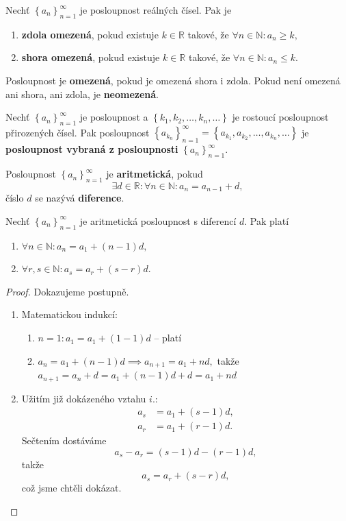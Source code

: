 \begin{definition}
    Nechť $\left \{ a_n \right \}_{n=1}^\infty $ je posloupnost reálných čísel. Pak je
    \begin{enumerate}[$i.$]
    \item \textbf{zdola omezená}, pokud existuje $k\in \mathbb R$ takové, že
    $\forall n \in \mathbb N\colon a_n \geq k,$
   	\item \textbf{shora omezená}, pokud existuje $k\in \mathbb R$ takové, že
    $\forall n \in \mathbb N\colon a_n \leq k.$
    \end{enumerate}
    Posloupnost je \textbf{omezená}, pokud je omezená shora i zdola.
    Pokud není omezená ani shora, ani zdola, je \textbf{neomezená}.
\end{definition}

\begin{definition}
Nechť $\left \{ a_n \right \}_{n=1}^\infty $ je posloupnost a
$\left \{ k_1,k_2,\dots,k_n,\dots \right \} $ je rostoucí posloupnost přirozených čísel.
Pak posloupnost $\left \{a_{k_n} \right \}_{n=1}^\infty = \left \{ a_{k_1}, a_{k_2}, \dots, a_{k_n},\dots \right \}  $
je \textbf{posloupnost vybraná z posloupnosti} $\left \{ a_n \right \}_{n=1}^\infty $.
\end{definition}

\begin{definition}
Posloupnost $\left \{ a_n \right \}_{n=1}^\infty $ je \textbf{aritmetická}, pokud
$$\exists d \in \mathbb R\colon \forall n \in \mathbb N\colon a_n=a_{n-1}+d,$$
číslo $d$ se nazývá \textbf{diference}.
\end{definition}

\begin{veta}
    Nechť $\left \{ a_n \right \}_{n=1}^\infty $ je aritmetická posloupnost s diferencí
    $d$. Pak platí
    \begin{enumerate}[$i.$]
    \item $\forall n\in \mathbb N\colon a_n = a_1 + (n-1)d,$
   	\item $\forall r,s \in \mathbb N\colon a_s = a_r + (s-r)d.$
    \end{enumerate}
\end{veta}

\begin{proof} Dokazujeme postupně.
\begin{enumerate}[$i.$]
\item Matematickou indukcí:
\begin{enumerate}[1.]
\item $n=1\colon a_1 = a_1+(1-1)d$ -- platí
\item $a_n = a_1+(n-1)d \implies a_{n+1}=a_1+nd,$ takže $a_{n+1}=a_n+d=a_1+(n-1)d+d=a_1+nd$
\end{enumerate}
\item Užitím již dokázeného vztahu $i.$:
\begin{align*}
    a_s &= a_1 + (s-1)d,\\
    a_r &= a_1 + (r-1)d.
\end{align*}
Sečtením dostáváme
$$a_s-a_r = (s-1)d-(r-1)d,$$
takže
$$a_s=a_r+(s-r)d,$$
což jsme chtěli dokázat.\qedhere
\end{enumerate}
\end{proof}

